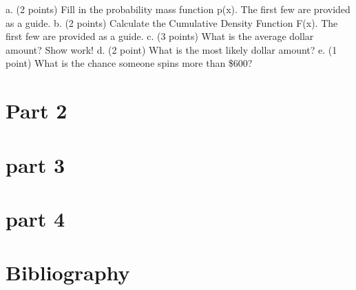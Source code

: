 \documentclass[letterpaper, onecolumn,10pt]{IEEEtran}
\begin{document}
		 a. (2 points) Fill in the probability mass function p(x). The first few are provided as a guide.
b. (2 points) Calculate the Cumulative Density Function F(x). The first few are provided as a guide.
c. (3 points) What is the average dollar amount? Show work!
d. (2 point) What is the most likely dollar amount?
e. (1 point) What is the chance someone spins more than \$600?
		\fi
		\section{Part 2}
		
		\iffalse
Part 3. (6 points) Suppose a contestant spins the wheel three times.
a. (2 points) If spinning a “$0” is considered the event of interest, and each spin is independent of the other
spins, what common discrete distribution best models X the number of “$0” outcomes among 3 spins?
b. (2 points) How likely is it they spin $0 each time? Show work!
c. (2 points) How likely is it they spin $0 at least one time? Show work!
		\fi
		
		\section{part 3}
			
		
		\iffalse
		    Part 4: (6 points) The probabilities in Part 2 are based on probability theory aka “math”. Do these probabilities
stand up when a contestant actually spins the wheel? Go back to the Data Analysis #1 instructions page.
Download the R script titled: Wheel\_of\_Fortune\_Spin\_Script.R , open the file it will automatically open in R.
You need R software on the computer to open the script window. Follow the instructions in the code then
answer the following:
a. (1 point) What value did you spin?
b. (1 point) What is the average of the 1000 simulated spins? How different is this from the average you
calculated in part 2?
c. (1 point) Paste the probability mass function and the plot of the probability mass function from R.
d. (1 point) How different are the simulated probabilities to the theoretical probabilities in part 2?
e. (1 point) Based on the plot is the most likely outcome the same as it is in part 2?
f. (1 point) In general, what action will make the simulated values more like the theoretical ones? 
		\fi
		\section{part 4}
		
		
		\section{Bibliography}
		
		
\end{document}
